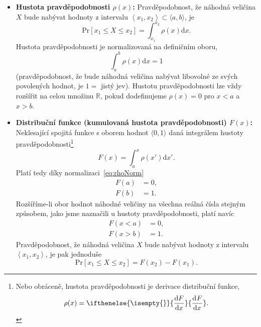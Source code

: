 \documentclass[a4paper,11pt,twoside]{article}
\renewcommand{\d}{\mathrm{d}}
\newcommand{\derivative}[3][]{\ifthenelse{\isempty{#1}}	    %
	{\frac{\d{#2}}{\d{#3}}}
	{\frac{\d^{#1}{#2}}{\d{#3}^{#1}}}
}
\def\probability#1{\mathrm{Pr}\left[#1\right]}
\theoremstyle{red}
\theoremstyle{green}
\begin{document}
        \begin{itemize}
            \item {\bf Hustota pravděpodobnosti  $\rho(x)$:}
                Pravděpodobnost, že náhodná veličina $X$ bude nabývat hodnoty z intervalu $\left\langle x_{1},x_{2}\right\rangle\subset\langle a,b\rangle$, je
                \begin{equation}
                    \probability{x_{1}\le X\le x_{2}}=\int_{x_{1}}^{x_{2}}\rho(x)\d x.
                \end{equation}
                Hustota pravděpodobnosti je normalizovaná na definičním oboru,
                \begin{equation}\label{eq:rhoNorm}
                    \int_{a}^{b}\rho(x)\d x=1
                \end{equation}
                (pravděpodobnost, že bude náhodná veličina nabývat libovolné ze svých povolených hodnot, je $1=$ jistý jev).
                Hustotu pravděpodobnosti lze vždy rozšířit na celou množinu $\mathbb{R}$, pokud dodefinujeme $\rho(x)=0$ pro $x<a$ a $x>b$.

            \item {\bf Distribuční funkce (kumulovaná hustota pravděpodobnosti) $F(x)$:} 
                Neklesající spojitá funkce s oborem hodnot $\langle 0,1\rangle$ daná integrálem hustoty pravděpodobnosti\footnote{
                    Nebo obráceně, hustota pravděpodobnosti je derivace distribuční funkce,
                    \begin{equation}
                        \label{eq:rhoF}
                        \rho(x)=\derivative{F}{x}.
                    \end{equation}
                }
                \begin{equation}
                    F(x)=\int_{a}^{x}\rho(x')\d x'.
                \end{equation}
                Platí tedy díky normalizaci~\eqref{eq:rhoNorm}
                \begin{align*}
                    F(a)&=0,\\
                    F(b)&=1.
                \end{align*}
                Rozšíříme-li obor hodnot náhodné veličiny na všechna reálná čísla stejným způsobem, jako jsme naznačili u hustoty pravděpodobnosti, platí navíc
                \begin{align*}
                    F(x<a)&=0,\\
                    F(x>b)&=1.
                \end{align*}
                Pravděpodobnost, že náhodná veličina $X$ bude nabývat hodnoty z intervalu $\left\langle x_{1},x_{2}\right\rangle$, je pak jednoduše
                \begin{equation}
                    \probability{x_{1}\le X\le x_{2}}=F(x_{2})-F(x_{1}).
                \end{equation}


\end{itemize}
\end{document}
